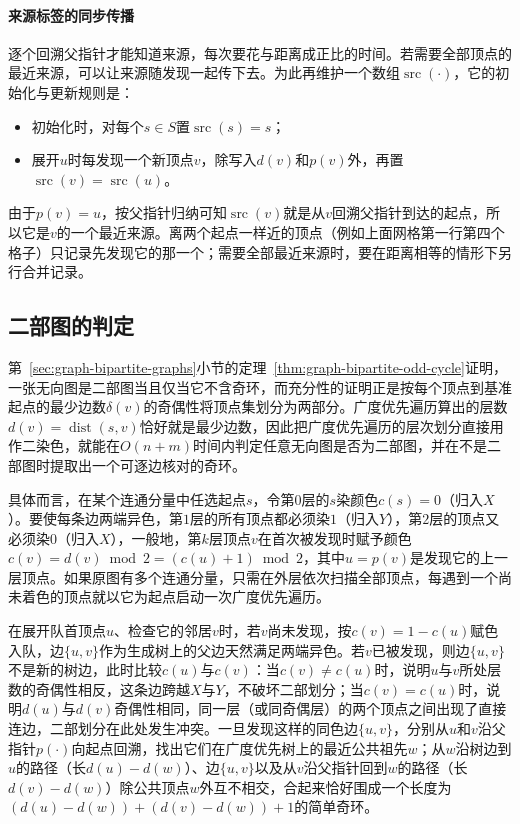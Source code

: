 \paragraph{来源标签的同步传播}
逐个回溯父指针才能知道来源，每次要花与距离成正比的时间。若需要全部顶点的最近来源，可以让来源随发现一起传下去。为此再维护一个数组$\operatorname{src}(\cdot)$，它的初始化与更新规则是：
\begin{itemize}
  \item 初始化时，对每个$s\in S$置$\operatorname{src}(s)=s$；
  \item 展开$u$时每发现一个新顶点$v$，除写入$d(v)$和$p(v)$外，再置$\operatorname{src}(v)=\operatorname{src}(u)$。
\end{itemize}

由于$p(v)=u$，按父指针归纳可知$\operatorname{src}(v)$就是从$v$回溯父指针到达的起点，所以它是$v$的一个最近来源。离两个起点一样近的顶点（例如上面网格第一行第四个格子）只记录先发现它的那一个；需要全部最近来源时，要在距离相等的情形下另行合并记录。

\subsection{二部图的判定}
\label{sec:graph-bfs-bipartite}

第~\ref{sec:graph-bipartite-graphs}小节的定理~\ref{thm:graph-bipartite-odd-cycle}证明，一张无向图是二部图当且仅当它不含奇环，而充分性的证明正是按每个顶点到基准起点的最少边数$\delta(v)$的奇偶性将顶点集划分为两部分。广度优先遍历算出的层数$d(v)=\operatorname{dist}(s,v)$恰好就是最少边数，因此把广度优先遍历的层次划分直接用作二染色，就能在$O(n+m)$时间内判定任意无向图是否为二部图，并在不是二部图时提取出一个可逐边核对的奇环。

具体而言，在某个连通分量中任选起点$s$，令第$0$层的$s$染颜色$c(s)=0$（归入$X$）。要使每条边两端异色，第$1$层的所有顶点都必须染$1$（归入$Y$），第$2$层的顶点又必须染$0$（归入$X$），一般地，第$k$层顶点$v$在首次被发现时赋予颜色$c(v)=d(v)\bmod 2=(c(u)+1)\bmod 2$，其中$u=p(v)$是发现它的上一层顶点。如果原图有多个连通分量，只需在外层依次扫描全部顶点，每遇到一个尚未着色的顶点就以它为起点启动一次广度优先遍历。

在展开队首顶点$u$、检查它的邻居$v$时，若$v$尚未发现，按$c(v)=1-c(u)$赋色入队，边$\{u,v\}$作为生成树上的父边天然满足两端异色。若$v$已被发现，则边$\{u,v\}$不是新的树边，此时比较$c(u)$与$c(v)$：当$c(v)\neq c(u)$时，说明$u$与$v$所处层数的奇偶性相反，这条边跨越$X$与$Y$，不破坏二部划分；当$c(v)=c(u)$时，说明$d(u)$与$d(v)$奇偶性相同，同一层（或同奇偶层）的两个顶点之间出现了直接连边，二部划分在此处发生冲突。一旦发现这样的同色边$\{u,v\}$，分别从$u$和$v$沿父指针$p(\cdot)$向起点回溯，找出它们在广度优先树上的最近公共祖先$w$；从$w$沿树边到$u$的路径（长$d(u)-d(w)$）、边$\{u,v\}$以及从$v$沿父指针回到$w$的路径（长$d(v)-d(w)$）除公共顶点$w$外互不相交，合起来恰好围成一个长度为$(d(u)-d(w))+(d(v)-d(w))+1$的简单奇环。

